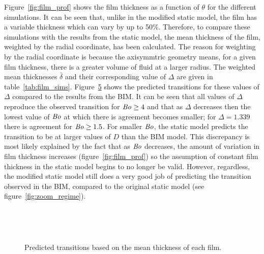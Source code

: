 \documentclass[12pt]{article}
\newcommand\Bo{\mbox{\textit{Bo}}}  %
\begin{document}
Figure~\ref{fig:film_prof} shows the film thickness as a function of $\theta$ for the different simulations. It can be seen that, unlike in the modified static model, the film has a variable thickness which can vary by up to 50\%. Therefore, to compare these simulations with the results from the static model, the mean thickness of the film, weighted by the radial coordinate, has been calculated. The reason for weighting by the radial coordinate is because the axisymmtric geometry means, for a given film thickness, there is a greater volume of fluid at a larger radius. The weighted mean thicknesses $\bar{\delta}$ and their corresponding value of $\Delta$ are given in table~\ref{tab:film_sims}. Figure~\ref{fig:float_trans} shows the predicted transitions for these values of $\Delta$ compared to the results from the BIM. It can be seen that all values of $\Delta$ reproduce the observed transition for $\Bo \geq 4$ and that as $\Delta$ decreases then the lowest value of $\Bo$ at which there is agreement becomes smaller; for $\Delta = 1.339$ there is agreement for $\Bo \geq 1.5$. For smaller $\Bo$, the static model predicts the transition to be at larger values of $D$ than the BIM model. This discrepancy is most likely explained by the fact that as $\Bo$ decreases, the amount of variation in film thickness increases (figure~\ref{fig:film_prof}) so the assumption of constant film thickness in the static model begins to no longer be valid. However, regardless, the modified static model still does a very good job of predicting the transition observed in the BIM, compared to the original static model (see figure~\ref{fig:zoom_regime}).

    \begin{figure}
      \centering
      \begin{subfigure}[b]{0.45\textwidth}
        \resizebox{\textwidth}{!}{\Large }
        \caption{}
        \label{fig:float1}
      \end{subfigure}
      ~
      \begin{subfigure}[b]{0.45\textwidth}
        \resizebox{\textwidth}{!}{\Large }
        \caption{}
        \label{fig:float2}
      \end{subfigure}
      
      \begin{subfigure}[b]{0.45\textwidth}
        \resizebox{\textwidth}{!}{\Large }
        \caption{}
        \label{fig:float3}
      \end{subfigure}
      ~
      \begin{subfigure}[b]{0.45\textwidth}
        \resizebox{\textwidth}{!}{\Large }
        \caption{}
        \label{fig:float4}
      \end{subfigure}
      \caption{Predicted transitions based on the mean thickness of each film. }\label{fig:float_trans}
    \end{figure}
\end{document}
